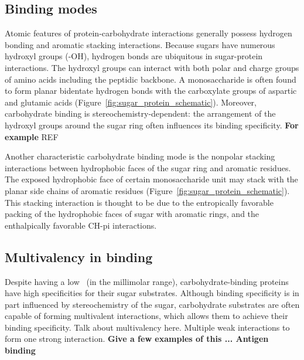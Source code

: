 \subsection{Binding modes}
Atomic features of protein-carbohydrate interactions generally possess hydrogen bonding and aromatic stacking interactions.\cite{Vyas:1991p6498} Because sugars have numerous hydroxyl groups (-OH), hydrogen bonds are ubiquitous in sugar-protein interactions. The hydroxyl groups can interact with both polar and charge groups of amino acids including the peptidic backbone.  A monosaccharide is often found to form planar bidentate hydrogen bonds with the carboxylate groups of aspartic and glutamic acids (Figure~\ref{fig:sugar_protein_schematic}).  Moreover, carbohydrate binding is stereochemistry-dependent: the arrangement of the hydroxyl groups around the sugar ring often influences its binding specificity. \textbf{For example} REF
 
Another characteristic carbohydrate binding mode is the nonpolar stacking interactions between hydrophobic faces of the sugar ring and aromatic residues.  The exposed hydrophobic face of certain monosaccharide unit may stack with the planar side chains of aromatic residues (Figure~\ref{fig:sugar_protein_schematic}).  This stacking interaction is thought to be due to the entropically favorable packing of the hydrophobic faces of sugar with aromatic rings, and the enthalpically favorable CH-pi interactions.\cite{delCarmenFernandezAlonso:2012tq} %

 \subsection{Multivalency in binding}
Despite having a low \KD\ (in the millimolar range), carbohydrate-binding proteins have high specificities for their sugar substrates. Although binding specificity is in part influenced by stereochemistry of the sugar, carbohydrate substrates are often capable of forming multivalent interactions, which allows them to achieve their binding specificity.   Talk about multivalency here.  Multiple weak interactions to form one strong interaction.
\textbf{Give a few examples of this ... Antigen binding}


